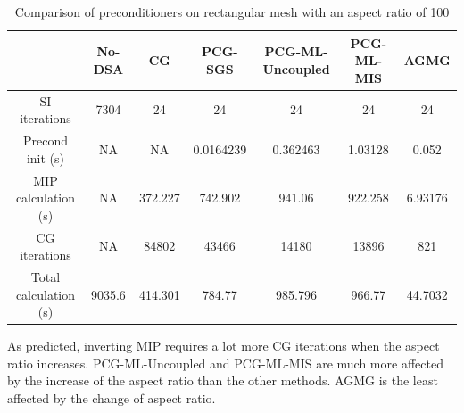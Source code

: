 \begin{table}[H]
  \caption{Comparison of preconditioners on rectangular mesh with an aspect
  ratio of 100}
  \begin{center}
    \begin{tabular}{|c|c|c|c|c|c|c|}
      \hline
       & No-DSA & CG & PCG-SGS & PCG-ML-Uncoupled & PCG-ML-MIS & AGMG \\
      \hline
      SI iterations & 7304    & 24      & 24        & 24       & 24      & 24 \\
   Precond init (s) & NA      & NA      & 0.0164239 & 0.362463 & 1.03128 & 0.052 \\
MIP calculation (s) & NA      & 372.227 & 742.902   & 941.06   & 922.258 &
      6.93176 \\
      CG iterations & NA      & 84802   & 43466     & 14180    & 13896   & 821 \\
Total calculation (s) & 9035.6 & 414.301 & 784.77   & 985.796  & 966.77  &
      44.7032 \\
      \hline
    \end{tabular}
    \label{table_ar_100}
  \end{center}
\end{table}                  
As predicted, inverting MIP requires a lot more CG iterations when the aspect
ratio increases. PCG-ML-Uncoupled and PCG-ML-MIS are much more affected by the
increase of the aspect ratio than the other methods. AGMG is the least
affected by the change of aspect ratio.
